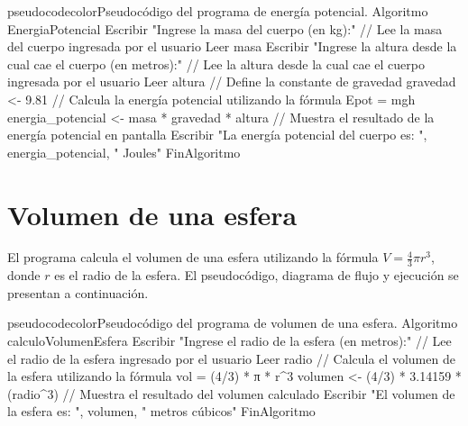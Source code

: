 \begin{sourcecode}{pseudocodecolor}{Pseudocódigo del programa de energía potencial.}
Algoritmo EnergiaPotencial
	Escribir "Ingrese la masa del cuerpo (en kg):"
	// Lee la masa del cuerpo ingresada por el usuario
	Leer masa
	Escribir "Ingrese la altura desde la cual cae el cuerpo (en metros):"
	// Lee la altura desde la cual cae el cuerpo ingresada por el usuario
	Leer altura
	// Define la constante de gravedad
	gravedad <- 9.81
	// Calcula la energía potencial utilizando la fórmula Epot = mgh
	energia_potencial <- masa * gravedad * altura
	// Muestra el resultado de la energía potencial en pantalla
	Escribir "La energía potencial del cuerpo es: ", energia_potencial, " Joules"
FinAlgoritmo
\end{sourcecode}



\section{Volumen de una esfera}

El programa calcula el volumen de una esfera utilizando la fórmula $V = \frac{4}{3}\pi r^3$, donde $r$ es el radio de la esfera. El pseudocódigo, diagrama de flujo y ejecución se presentan a continuación.

\begin{sourcecode}{pseudocodecolor}{Pseudocódigo del programa de volumen de una esfera.}
Algoritmo calculoVolumenEsfera
    Escribir "Ingrese el radio de la esfera (en metros):"
    // Lee el radio de la esfera ingresado por el usuario
    Leer radio
    // Calcula el volumen de la esfera utilizando la fórmula vol = (4/3) * π * r^3
    volumen <- (4/3) * 3.14159 * (radio^3)
    // Muestra el resultado del volumen calculado
    Escribir "El volumen de la esfera es: ", volumen, " metros cúbicos"
FinAlgoritmo
\end{sourcecode}


